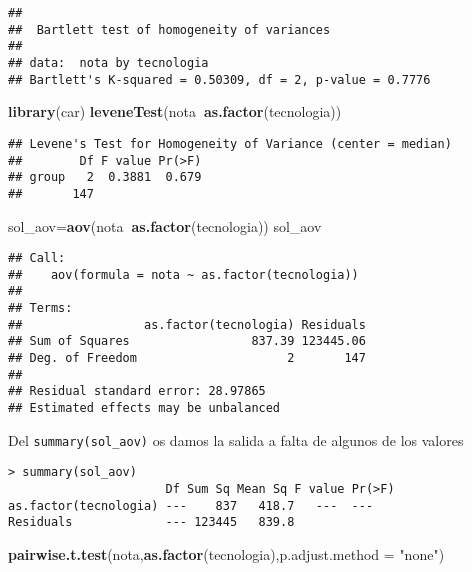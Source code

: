 \documentclass[
]{article}
\newenvironment{Shaded}{\begin{snugshade}}{\end{snugshade}}
\newcommand{\DataTypeTok}[1]{\textcolor[rgb]{0.13,0.29,0.53}{#1}}
\newcommand{\KeywordTok}[1]{\textcolor[rgb]{0.13,0.29,0.53}{\textbf{#1}}}
\newcommand{\NormalTok}[1]{#1}
\newcommand{\OperatorTok}[1]{\textcolor[rgb]{0.81,0.36,0.00}{\textbf{#1}}}
\newcommand{\StringTok}[1]{\textcolor[rgb]{0.31,0.60,0.02}{#1}}
\begin{document}
\begin{verbatim}
## 
##  Bartlett test of homogeneity of variances
## 
## data:  nota by tecnologia
## Bartlett's K-squared = 0.50309, df = 2, p-value = 0.7776
\end{verbatim}

\begin{Shaded}
\begin{Highlighting}[]
\KeywordTok{library}\NormalTok{(car)}
\KeywordTok{leveneTest}\NormalTok{(nota}\OperatorTok{~}\KeywordTok{as.factor}\NormalTok{(tecnologia))}
\end{Highlighting}
\end{Shaded}

\begin{verbatim}
## Levene's Test for Homogeneity of Variance (center = median)
##        Df F value Pr(>F)
## group   2  0.3881  0.679
##       147
\end{verbatim}

\begin{Shaded}
\begin{Highlighting}[]
\NormalTok{sol_aov=}\KeywordTok{aov}\NormalTok{(nota}\OperatorTok{~}\KeywordTok{as.factor}\NormalTok{(tecnologia))}
\NormalTok{sol_aov}
\end{Highlighting}
\end{Shaded}

\begin{verbatim}
## Call:
##    aov(formula = nota ~ as.factor(tecnologia))
## 
## Terms:
##                 as.factor(tecnologia) Residuals
## Sum of Squares                 837.39 123445.06
## Deg. of Freedom                     2       147
## 
## Residual standard error: 28.97865
## Estimated effects may be unbalanced
\end{verbatim}

Del \texttt{summary(sol\_aov)} os damos la salida a falta de algunos de
los valores

\begin{verbatim}
> summary(sol_aov)
                      Df Sum Sq Mean Sq F value Pr(>F)
as.factor(tecnologia) ---    837   418.7   ---  ---
Residuals             --- 123445   839.8                          
\end{verbatim}

\begin{Shaded}
\begin{Highlighting}[]
\KeywordTok{pairwise.t.test}\NormalTok{(nota,}\KeywordTok{as.factor}\NormalTok{(tecnologia),}\DataTypeTok{p.adjust.method =} \StringTok{"none"}\NormalTok{)}
\end{Highlighting}
\end{Shaded}
\end{document}
